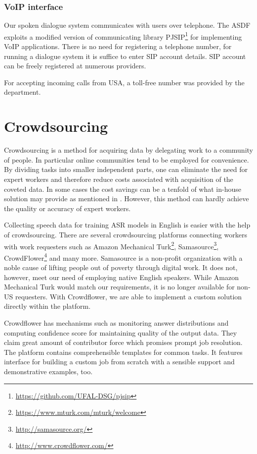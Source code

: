 \subsubsection{VoIP interface}

Our spoken dialogue system communicates with users over telephone.
The ASDF exploits a modified version of communicating library PJSIP\footnote{\url{https://github.com/UFAL-DSG/pjsip}} for implementing VoIP applications.
There is no need for registering a telephone number, for running a dialogue system it is suffice to enter SIP account details.
SIP account can be freely registered at numerous providers.

For accepting incoming calls from USA, a toll-free number was provided by the department.

\section{Crowdsourcing}

Crowdsourcing is a method for acquiring data by delegating work to a community of people.
In particular online communities tend to be employed for convenience.
By dividing tasks into smaller independent parts, one can eliminate the need for expert workers and therefore reduce costs associated with acquisition of the coveted data.
In some cases the cost savings can be a tenfold of what in-house solution may provide as mentioned in \cite{mturk}. %
However, this method can hardly achieve the quality or accuracy of expert workers.

Collecting speech data for training ASR models in English is easier with the help of crowdsourcing.
There are several crowdsourcing platforms connecting workers with work requesters such as
Amazon Mechanical Turk\footnote{\url{https://www.mturk.com/mturk/welcome}},
Samasource\footnote{\url{http://samasource.org/}},
CrowdFlower\footnote{\url{http://www.crowdflower.com/}}
and many more.
Samasource is a non-profit organization with a noble cause of lifting people out of poverty through digital work.
It does not, however, meet our need of employing native English speakers.
While Amazon Mechanical Turk would match our requirements, it is no longer available for non-US requesters.
With Crowdflower, we are able to implement a custom solution directly within the platform.

Crowdflower has mechanisms such as monitoring answer distributions and computing confidence score for maintaining quality of the output data. %
They claim great amount of contributor force which promises prompt job resolution. %
The platform contains comprehensible templates for common tasks.
It features interface for building a custom job from scratch with a sensible support and demonstrative examples, too. %


